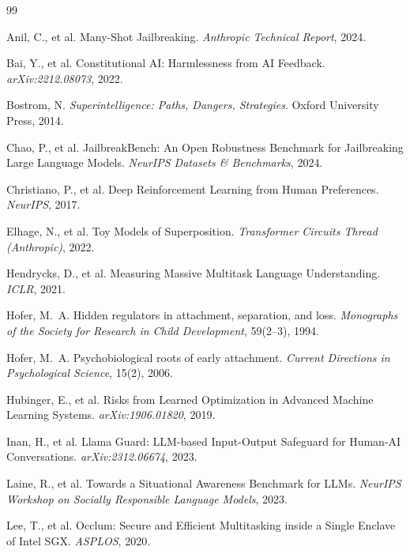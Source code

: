 \documentclass[10pt,letterpaper]{article}
\theoremstyle{definition}
\theoremstyle{plain}
\begin{document}
\begin{thebibliography}{99}\small

Anil, C., et al.
\newblock Many-Shot Jailbreaking.
\newblock \emph{Anthropic Technical Report}, 2024.

Bai, Y., et al.
\newblock Constitutional AI: Harmlessness from AI Feedback.
\newblock \emph{arXiv:2212.08073}, 2022.

Bostrom, N.
\newblock \emph{Superintelligence: Paths, Dangers, Strategies}. Oxford
University Press, 2014.

Chao, P., et al.
\newblock JailbreakBench: An Open Robustness Benchmark for Jailbreaking
Large Language Models.
\newblock \emph{NeurIPS Datasets \& Benchmarks}, 2024.

Christiano, P., et al.
\newblock Deep Reinforcement Learning from Human Preferences.
\newblock \emph{NeurIPS}, 2017.

Elhage, N., et al.
\newblock Toy Models of Superposition.
\newblock \emph{Transformer Circuits Thread (Anthropic)}, 2022.

Hendrycks, D., et al.
\newblock Measuring Massive Multitask Language Understanding.
\newblock \emph{ICLR}, 2021.

Hofer, M.~A.
\newblock Hidden regulators in attachment, separation, and loss.
\newblock \emph{Monographs of the Society for Research in Child
Development}, 59(2--3), 1994.

Hofer, M.~A.
\newblock Psychobiological roots of early attachment.
\newblock \emph{Current Directions in Psychological Science}, 15(2),
2006.

Hubinger, E., et al.
\newblock Risks from Learned Optimization in Advanced Machine Learning
Systems.
\newblock \emph{arXiv:1906.01820}, 2019.

Inan, H., et al.
\newblock Llama Guard: LLM-based Input-Output Safeguard for Human-AI
Conversations.
\newblock \emph{arXiv:2312.06674}, 2023.

Laine, R., et al.
\newblock Towards a Situational Awareness Benchmark for LLMs.
\newblock \emph{NeurIPS Workshop on Socially Responsible Language
Models}, 2023.

Lee, T., et al.
\newblock Occlum: Secure and Efficient Multitasking inside a Single
Enclave of Intel SGX.
\newblock \emph{ASPLOS}, 2020.


\end{thebibliography}
\end{document}
